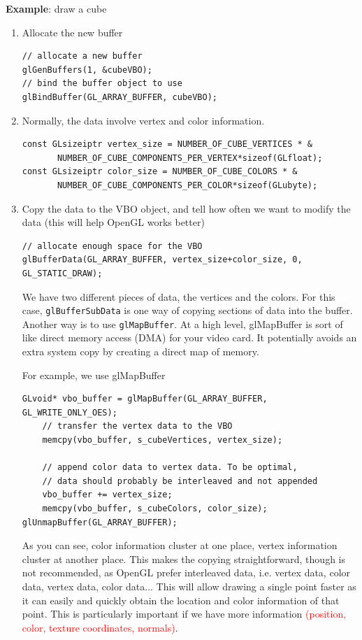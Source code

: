 {\bf Example}: draw a cube
\begin{enumerate}
\item Allocate the new buffer
\begin{verbatim}
// allocate a new buffer
glGenBuffers(1, &cubeVBO);
// bind the buffer object to use
glBindBuffer(GL_ARRAY_BUFFER, cubeVBO);
\end{verbatim}

\item Normally, the data involve vertex and color information. 
\begin{verbatim}
const GLsizeiptr vertex_size = NUMBER_OF_CUBE_VERTICES * &
       NUMBER_OF_CUBE_COMPONENTS_PER_VERTEX*sizeof(GLfloat);
const GLsizeiptr color_size = NUMBER_OF_CUBE_COLORS * &
       NUMBER_OF_CUBE_COMPONENTS_PER_COLOR*sizeof(GLubyte);
\end{verbatim}

\item Copy the data to the VBO object, and tell how often we want to
  modify the data (this will help OpenGL works  better)
\begin{verbatim}
// allocate enough space for the VBO
glBufferData(GL_ARRAY_BUFFER, vertex_size+color_size, 0, GL_STATIC_DRAW);
\end{verbatim}
  We have two different pieces of data, the vertices and the
  colors. For this case, \verb!glBufferSubData! is one way of copying
  sections of data into the buffer. Another way is to use
  \verb!glMapBuffer!. At a high level, glMapBuffer is sort of like
  direct memory access (DMA) for your video card. It potentially
  avoids an extra system copy by creating a direct map of memory.

  For example, we use glMapBuffer
\begin{verbatim}
GLvoid* vbo_buffer = glMapBuffer(GL_ARRAY_BUFFER, GL_WRITE_ONLY_OES);
	// transfer the vertex data to the VBO
	memcpy(vbo_buffer, s_cubeVertices, vertex_size);

	// append color data to vertex data. To be optimal,
	// data should probably be interleaved and not appended
	vbo_buffer += vertex_size;
	memcpy(vbo_buffer, s_cubeColors, color_size);
glUnmapBuffer(GL_ARRAY_BUFFER); 
\end{verbatim}
  As you can see, color information cluster at one place, vertex
  information cluster at another place. This makes the copying
  straightforward, though is not recommended, as OpenGL prefer
  interleaved data, i.e. vertex data, color data, vertex data, color
  data... This will allow drawing a single point faster as it can
  easily and quickly obtain the location and color information of that
  point. This is particularly important if we have more information
  \textcolor{red}{(position, color, texture coordinates, normals)}.


\end{enumerate}
